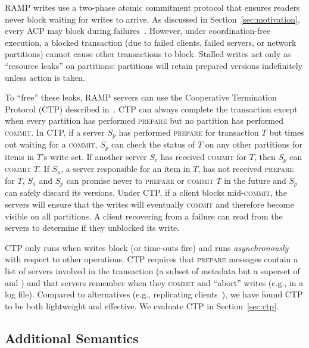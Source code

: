  RAMP writes use a two-phase atomic
commitment protocol that ensures readers never block waiting for
writes to arrive. As discussed in Section~\ref{sec:motivation}, every
ACP may block during failures~\cite{bernstein-book}. However, under 
coordination-free execution, a blocked transaction (due to failed
clients, failed servers, or network partitions) cannot cause other
transactions to block. Stalled writes act only as ``resource
leaks'' on partitions: partitions will retain prepared versions
indefinitely unless action is taken.

To ``free'' these leaks, RAMP servers can use the Cooperative
Termination Protocol (CTP) described in~\cite{bernstein-book}. CTP can
always complete the transaction except when every partition has
performed \textsc{prepare} but no partition has performed
\textsc{commit}. In CTP, if a server $S_p$ has performed
\textsc{prepare} for transaction $T$ but times out waiting for a
\textsc{commit}, $S_p$ can check the status of $T$ on any other
partitions for items in $T$'s write set. If another server $S_c$ has
received \textsc{commit} for $T$, then $S_p$ can \textsc{commit}
$T$. If $S_a$, a server responsible for an item in $T$, has not
received \textsc{prepare} for $T$, $S_a$ and $S_p$ can promise never
to \textsc{prepare} or \textsc{commit} $T$ in the future and $S_p$ can
safely discard its versions.  Under CTP, if a client blocks
mid-\textsc{commit}, the servers will ensure that the writes will
eventually \textsc{commit} and therefore become visible on all
partitions. A client recovering from a failure can read from the
servers to determine if they unblocked its write.

CTP only runs when writes
block (or time-outs fire) and runs \textit{asynchronously} with
respect to other operations. CTP requires that \textsc{prepare}
messages contain a list of servers involved in the transaction (a
subset of \rapl metadata but a superset of \rapb and \raps) and that
servers remember when they \textsc{commit} and ``abort'' writes (e.g.,
in a log file). Compared to alternatives (e.g., replicating
clients~\cite{paxos-commit}), we have found CTP to be both lightweight
and effective. We evaluate CTP in Section~\ref{sec:ctp}.

\subsection{Additional Semantics}
\label{sec:ramp-semantics}

